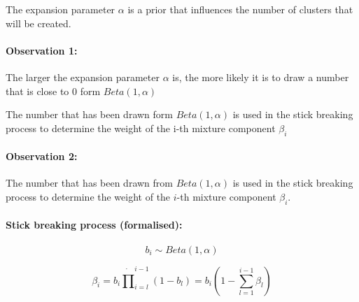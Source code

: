 The expansion parameter $\alpha$ is a prior that influences the number of clusters that will be created.

\paragraph{Observation 1:}
The larger the expansion parameter $\alpha$ is, the more likely it is to draw a number that is close to $0$ form $Beta(1,\alpha)$

The number that has been drawn form $Beta(1,\alpha)$ is used in the stick breaking process to determine the weight of the i-th mixture component $\beta_i$

\paragraph{Observation 2:}
The number that has been drawn from \(Beta(1,\alpha)\) is used in the stick breaking process to determine the weight of the \(i\)-th mixture component \(\beta_i\).

\paragraph{Stick breaking process (formalised):}

\begin{equation*}
	b_i \sim Beta(1,\alpha)
\end{equation*}

\begin{equation*}
	\beta_i = b_i \dot \prod_{i=l}^{i-1}(1-b_l) = b_i (1 - \sum_{l=1}^{i-1} \beta_l)
\end{equation*}
